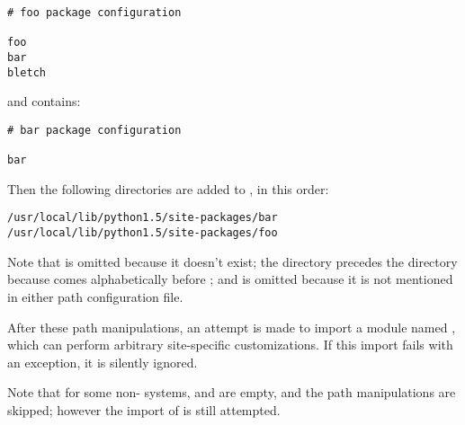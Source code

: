 \begin{verbatim}
# foo package configuration

foo
bar
bletch
\end{verbatim}

and  contains:

\begin{verbatim}
# bar package configuration

bar
\end{verbatim}

Then the following directories are added to , in this
order:

\begin{verbatim}
/usr/local/lib/python1.5/site-packages/bar
/usr/local/lib/python1.5/site-packages/foo
\end{verbatim}

Note that  is omitted because it doesn't exist; the
 directory precedes the  directory because
 comes alphabetically before ; and
 is omitted because it is not mentioned in either path
configuration file.

After these path manipulations, an attempt is made to import a module
named , which can
perform arbitrary site-specific customizations.  If this import fails
with an  exception, it is silently ignored.

Note that for some non-\UNIX{} systems,  and
 are empty, and the path manipulations are
skipped; however the import of
 is still attempted.
